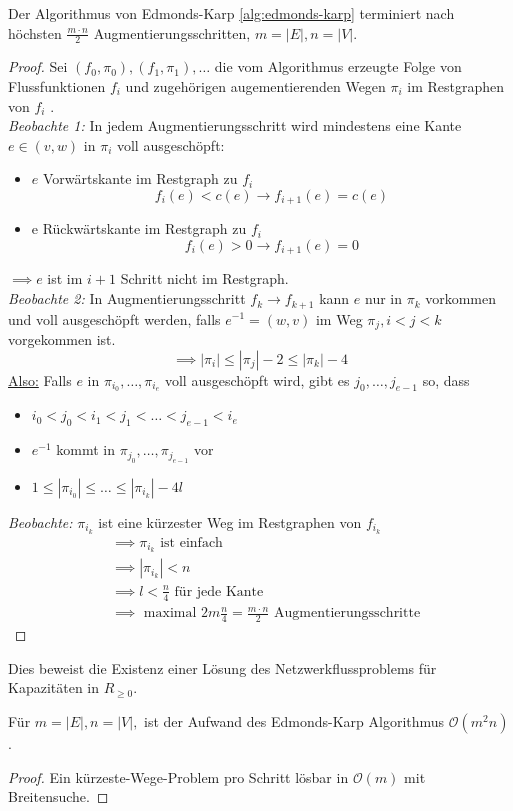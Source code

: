 \begin{theorem}
	Der Algorithmus von Edmonds-Karp \ref{alg:edmonds-karp} terminiert nach höchsten $\frac{m\cdot n}{2}$ Augmentierungsschritten, $m=|E|, n=|V|$. 
\end{theorem}
\begin{proof}
Sei $(f_0,\pi_0),(f_1,\pi_1),\ldots$ die vom Algorithmus erzeugte Folge von Flussfunktionen $f_i$  und zugehörigen augementierenden Wegen $\pi_i$ im Restgraphen von $f_i$ .\\
\emph{Beobachte 1:} In jedem Augmentierungsschritt wird mindestens eine Kante $e \in (v,w)$  in $\pi_i$ voll ausgeschöpft:
\begin{itemize}
	\item $e$ Vorwärtskante  im Restgraph zu $f_i$
		\[
		f_i(e) < c(e) \to f_{i+1}(e)=c(e)
		\]
	\item e Rückwärtskante im Restgraph zu $f_i$ 
		\[
		f_i(e)>0 \to f_{i+1}(e) = 0
		\]
\end{itemize}
$\implies e$ ist im $i+1$ Schritt nicht im Restgraph. \\
\emph{Beobachte 2:} In Augmentierungsschritt $f_k \to f_{k+1}$ kann $e$  nur in $\pi_k$ vorkommen und voll ausgeschöpft werden, falls $e^{-1}=(w,v)$ im Weg $\pi_j, i<j<k$ vorgekommen ist. 
\[
	\implies |\pi_i|\le |\pi_j| -2 \le |\pi_k| -4
\]
\underline{Also:} Falls $e$ in $\pi_{i_0},\ldots,\pi_{i_e}$ voll ausgeschöpft wird, gibt es $j_0,\ldots,j_{e-1}$ so, dass
\begin{itemize}
	\item $i_0<j_0<i_1<j_1<\ldots<j_{e-1} < i_{e}$
	\item $e^{-1}$ kommt in $\pi_{j_0},\ldots,\pi_{j_{e-1}}$ vor
	\item $1 \le |\pi_{i_0}| \le \ldots\le |\pi_{i_k}|-4l$ 
\end{itemize}
\emph{Beobachte:} $\pi_{i_k}$ ist eine kürzester Weg im Restgraphen von $f_{i_k}$
\begin{align*}
&\implies \pi_{i_k} \text{ ist einfach}\\
&\implies |\pi_{i_k}| <n \\
&\implies l< \frac{n}{4} \text{ für jede Kante}\\
&\implies \text{ maximal } 2m \frac{n}{4}= \frac{m\cdot n}{2} \text{ Augmentierungsschritte}
\end{align*}
\end{proof}
\begin{remark}
Dies beweist die Existenz einer Lösung des Netzwerkflussproblems  für Kapazitäten in $R_{\ge  0}$. 
\end{remark}
\begin{corollary}
	Für $m=|E|, n=|V|,$ ist der Aufwand des Edmonds-Karp Algorithmus $\mathcal{O}(m^2n)$. 
\end{corollary}
\begin{proof}
Ein kürzeste-Wege-Problem pro Schritt lösbar in $\mathcal{O}(m)$ mit Breitensuche.  
\end{proof}
